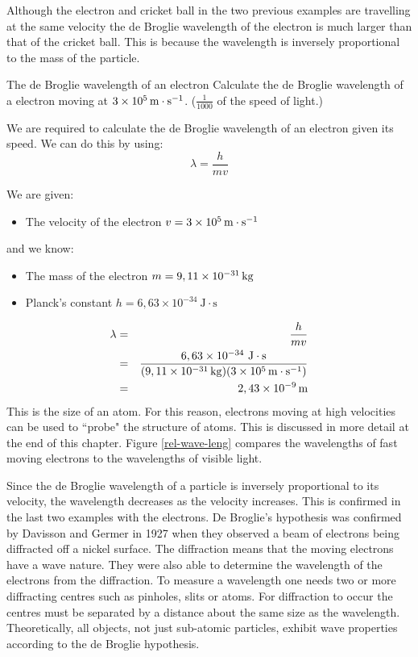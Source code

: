 Although the electron and cricket ball in the two previous examples are travelling at the same velocity the de Broglie wavelength of the electron is much larger than that of the cricket ball. This is because the wavelength is inversely proportional to the mass of the particle.

\begin{wex}{The de Broglie wavelength of an electron}
{Calculate the de Broglie wavelength of a electron moving at $3 \times 10^{5}\,\mathrm{m \cdot s^{-1}}$. ($\frac{1}{1000}$ of the speed of light.)}

{
We are required to calculate the de Broglie wavelength of an electron given its speed. We can do this by using:
$$\lambda=\frac{h}{mv}$$

We are given:
\begin{itemize}
\item The velocity of the electron {$v=3 \times 10^{5}\,\mathrm{m \cdot s^{-1}}$}
\end{itemize}
and we know:
\begin{itemize}
\item The mass of the electron {$m=9,11 \times 10^{-31}\,\mathrm{kg}$}
\item Planck's constant {$h=6,63\times10^{-34}~\mathrm{J\cdot s}$}
\end{itemize}

\begin{eqnarray*}
\lambda&=&\frac{h}{mv}\\
&=&\frac{6,63\times10^{-34}~\mathrm{J\cdot s}}{(9,11 \times 10^{-31}\,\mathrm{kg})(3 \times 10^{5}\,\mathrm{m \cdot s^{-1}})}\\
& = & 2,43 \times 10^{-9}\,\rm{m}
\end{eqnarray*}
This is the size of an atom. For this reason, electrons moving at high velocities can be used to ``probe" the structure of atoms. This is discussed in more detail at the end of this chapter.  Figure \ref{rel-wave-leng} compares the wavelengths of fast moving electrons to the wavelengths of visible light.}
\end{wex}

Since the de Broglie wavelength of a particle is inversely proportional to its velocity, the wavelength decreases as the velocity increases. This is confirmed in the last two examples with the electrons. 
De Broglie's hypothesis was confirmed by Davisson and Germer in 1927 when they observed a beam of electrons being diffracted off a nickel surface. The diffraction means that the moving electrons have a wave nature. They were also able to determine the wavelength of the electrons from the diffraction. To measure a wavelength one needs two or more diffracting centres such as pinholes, slits or atoms. For diffraction to occur the centres must be separated by a distance about the same size as the wavelength. Theoretically, all objects, not just sub-atomic particles, exhibit wave properties according to the de Broglie hypothesis.

